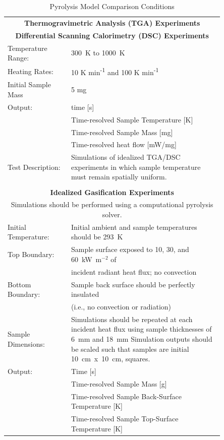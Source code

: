 \documentclass{article}
\begin{document}
\begin{table}[t!]
	\centering
	\caption{Pyrolysis Model Comparison Conditions}
	\label{table:Pyrolsis Model Comparison}
	\begin{tabular}{p{0.25\linewidth} p{0.6\linewidth}}
		\hline
		\multicolumn{2}{c}{\textbf{Thermogravimetric Analysis (TGA) Experiments} \quad [Two simulations]}\\
		\multicolumn{2}{c}{\textbf{Differential Scanning Calorimetry (DSC) Experiments} \quad [Two simulations]}\\
		\hline
		Temperature Range: & 300~K to 1000~K\\
		Heating Rates: & 10 K min\textsuperscript{-1} and 100 K min\textsuperscript{-1}\\
		Initial Sample Mass & 5 mg\\
		Output: & time [s]\\
		& Time-resolved Sample Temperature [K]\\
		& Time-resolved Sample Mass [mg]\\
		& Time-resolved heat flow [mW/mg]\\
		Test Description: & Simulations of idealized TGA/DSC experiments in which sample temperature must remain spatially uniform.\\
		\\
		\hline
		\multicolumn{2}{c}{\textbf{Idealized Gasification Experiments}\quad [Six simulations]}\\
		\multicolumn{2}{c}{Simulations should be performed using a computational pyrolysis solver.}\\
		\hline
		Initial Temperature: & Initial ambient and sample temperatures should be 293~K\\
		Top Boundary:& Sample surface exposed to 10, 30, and 60~kW~m$^{-2}$ of\\
		& incident radiant heat flux; no convection\\
		Bottom Boundary: & Sample back surface should be perfectly insulated \\
		& (i.e., no convection or radiation)\\
		Sample Dimensions: & Simulations should be repeated at each incident heat flux using sample thicknesses of 6~mm and 18~mm
		Simulation outputs should be scaled such that samples are initial 10~cm~x~10~cm, squares.\\
		Output: & Time [s]\\
		& Time-resolved Sample Mass [g]\\
		& Time-resolved Sample Back-Surface Temperature [K]\\
		& Time-resolved Sample Top-Surface Temperature [K]\\
		\hline
	\end{tabular}
\end{table}
\end{document}
